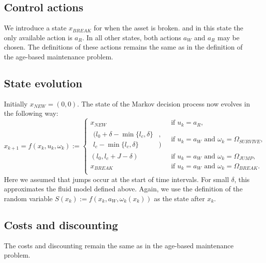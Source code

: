 \subsection{Control actions}
We introduce a state $x_{BREAK}$ for when the asset is broken.
and in this state the only available action is $a_R$.
In all other states, both actions $a_W$ and $a_R$ may be chosen.
The definitions of these actions remains the same as in the definition of the age-based maintenance problem.

\subsection{State evolution}
Initially $x_{NEW}=(0,0)$.
The state of the Markov decision process now evolves in the following way:
\[
x_{k+1}=f(x_k, u_k, \omega_k):=\begin{cases}
x_{NEW}&\ \text{if }u_k=a_R,\\
\begin{split}(l_0+\delta-\min\{l_c,\delta\}&,\\l_c-\min\{l_c,\delta\}&)\end{split}&\ \text{if }u_k=a_W\text{ and }\omega_k=\Omega_{SURVIVE},\\
(l_0,l_c+J-\delta)&\ \text{if }u_k=a_W\text{ and }\omega_k=\Omega_{JUMP},\\
x_{BREAK}&\ \text{if }u_k=a_W\text{ and }\omega_k=\Omega_{BREAK}.\\
\end{cases}
\]
Here we assumed that jumps occur at the start of time intervals.
For small $\delta$, this approximates the fluid model defined above.
Again, we use the definition of the random variable $S(x_k):=f(x_k,a_W,\omega_k(x_k))$ as the state after $x_k$.

\subsection{Costs and discounting}
The costs and discounting remain the same as in the age-based maintenance problem.

